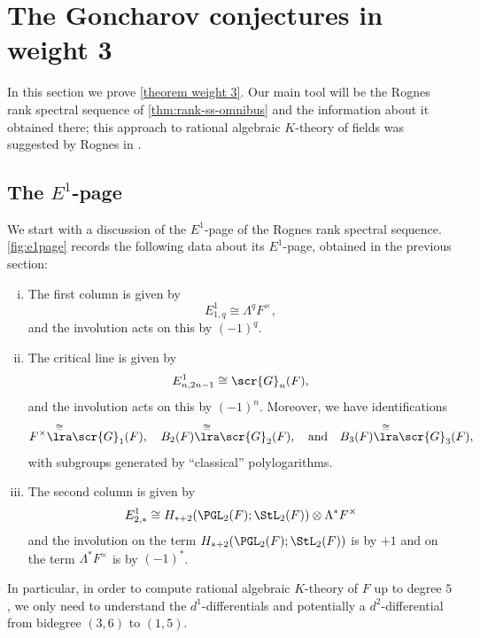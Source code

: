 \documentclass[a4paper]{amsart}
\begin{document}
\section{The Goncharov conjectures in weight 3}
In this section we prove \cref{theorem weight 3}. Our main tool will be the Rognes rank spectral sequence of \cref{thm:rank-ss-omnibus} and the information about it obtained there; this approach to rational algebraic $K$-theory of fields was suggested by Rognes in \cite{RognesMotivic}. 

\subsection{The $E^1$-page} We start with a discussion of the $E^1$-page of the Rognes rank spectral sequence. \cref{fig:e1page} records the following data about its $E^1$-page, obtained in the previous section:
\begin{enumerate}[(i)]
    \item The first column is given by 
    \[E^1_{1,q} \cong \Lambda^q F^\times,\]
    and the involution acts on this by $(-1)^q$.
    \item The critical line is given by
    \[E^1_{n,2n-1} \cong \scr{G}_n(F),\]
    and the involution acts on this by $(-1)^n$. Moreover, we have identifications 
    \[F^\times \overset{\cong}\lra \scr{G}_1(F), \quad B_2(F) \overset{\cong}\lra \scr{G}_2(F), \quad \text{and} \quad B_3(F) \overset{\cong}\lra \scr{G}_3(F),\]
    with subgroups generated by ``classical'' polylogarithms.
    \item The second column is given by 
    \[E^1_{2,*} \cong H_{*+2}(\PGL_2(F);\StL_2(F)) \otimes \Lambda^* F^\times\]
    and the involution on the term $H_{*+2}(\PGL_2(F);\StL_2(F))$ is by $+1$ and on the term $\Lambda^* F^\times$ is by $(-1)^*$. 
\end{enumerate}
In particular, in order to compute rational algebraic $K$-theory of $F$ up to degree $5$, we only need to understand the $d^1$-differentials and potentially a $d^2$-differential from bidegree $(3,6)$ to $(1,5)$. 
\end{document}
